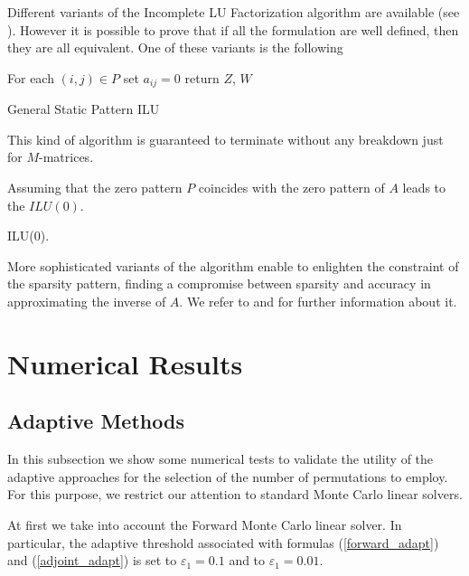 \documentclass[a4paper,10pt]{article}
\begin{document}
Different variants of the
Incomplete LU Factorization algorithm are available (see \cite{Saad}).
However it is
possible to prove that if all the formulation are well defined, then they are
all equivalent.
One of these variants is the following

\begin{algorithm}[H]
 For each $(i,j)\in P$ set $a_{ij}=0$\;
 return $Z$, $W$\;
 \caption{General Static Pattern ILU}
\end{algorithm}

This kind of algorithm is guaranteed to terminate without any breakdown just
for $M$-matrices.

Assuming that the zero pattern $P$ coincides with the zero pattern of $A$ leads
to the $ILU(0)$. \newline

\begin{algorithm}[H]
 \caption{ILU(0).}
\end{algorithm}

More sophisticated variants of the algorithm enable to enlighten the constraint
of the sparsity pattern, finding a compromise between sparsity and accuracy in
approximating the inverse of $A$. We refer to \cite{Saad} and
\cite{Benzi2002} for further information about it.

\section{Numerical Results}

\subsection{Adaptive Methods}

In this subsection we show some numerical tests to validate the utility of the
adaptive approaches for the selection of the number of permutations to employ.
For this purpose, we restrict our attention to standard Monte Carlo linear
solvers.

At first we take into account the Forward Monte Carlo linear solver.
In particular, the adaptive threshold associated with formulas
(\ref{forward_adapt}) and
(\ref{adjoint_adapt}) is set to $\varepsilon_1=0.1$ and to
$\varepsilon_1=0.01$. \newline
\end{document}
